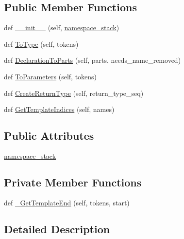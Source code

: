 \subsection*{Public Member Functions}
\begin{DoxyCompactItemize}
\item 
def \hyperlink{classcpp_1_1ast_1_1TypeConverter_ae6e75773d6722cdbb96d510a49cb633a}{\+\_\+\+\_\+init\+\_\+\+\_\+} (self, \hyperlink{classcpp_1_1ast_1_1TypeConverter_abb739f15c6cd0800e07c086c2b30833e}{namespace\+\_\+stack})
\item 
def \hyperlink{classcpp_1_1ast_1_1TypeConverter_aa6ea82e40cd30e5dfcd471ff144a19cf}{To\+Type} (self, tokens)
\item 
def \hyperlink{classcpp_1_1ast_1_1TypeConverter_a7c9d20d107c2bc0eb80afdf04957825f}{Declaration\+To\+Parts} (self, parts, needs\+\_\+name\+\_\+removed)
\item 
def \hyperlink{classcpp_1_1ast_1_1TypeConverter_aeaf27fb1890f65d7216703df610b46d5}{To\+Parameters} (self, tokens)
\item 
def \hyperlink{classcpp_1_1ast_1_1TypeConverter_a7e4d429131d9d5742ec44c78b61beb87}{Create\+Return\+Type} (self, return\+\_\+type\+\_\+seq)
\item 
def \hyperlink{classcpp_1_1ast_1_1TypeConverter_a7b5244be5a0caedd769ae866f8a182aa}{Get\+Template\+Indices} (self, names)
\end{DoxyCompactItemize}
\subsection*{Public Attributes}
\begin{DoxyCompactItemize}
\item 
\hyperlink{classcpp_1_1ast_1_1TypeConverter_abb739f15c6cd0800e07c086c2b30833e}{namespace\+\_\+stack}
\end{DoxyCompactItemize}
\subsection*{Private Member Functions}
\begin{DoxyCompactItemize}
\item 
def \hyperlink{classcpp_1_1ast_1_1TypeConverter_adcf38788abb48f32f4a63eb091b3d53a}{\+\_\+\+Get\+Template\+End} (self, tokens, start)
\end{DoxyCompactItemize}


\subsection{Detailed Description}


